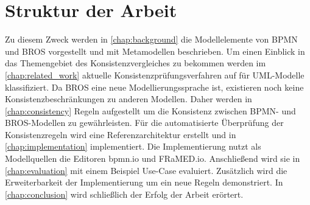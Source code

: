 \section{Struktur der Arbeit}

Zu diesem Zweck werden in \cref{chap:background} die Modellelemente von BPMN und BROS vorgestellt und mit Metamodellen beschrieben.
Um einen Einblick in das Themengebiet des Konsistenzvergleiches zu bekommen werden im \cref{chap:related_work} aktuelle Konsistenzprüfungsverfahren auf für UML-Modelle klassifiziert.
Da BROS eine neue Modellierungssprache ist, existieren noch keine Konsistenzbeschränkungen zu anderen Modellen.
Daher werden in \cref{chap:consistency} Regeln aufgestellt um die Konsistenz zwischen BPMN- und BROS-Modellen zu gewährleisten.
Für die automatisierte Überprüfung der Konsistenzregeln wird eine Referenzarchitektur erstellt und in \cref{chap:implementation} implementiert.
Die Implementierung nutzt als Modellquellen die Editoren bpmn.io und FRaMED.io.
Anschließend wird sie in \cref{chap:evaluation} mit einem Beispiel Use-Case evaluiert.
Zusätzlich wird die Erweiterbarkeit der Implementierung um ein neue Regeln demonstriert.
In \cref{chap:conclusion} wird schließlich der Erfolg der Arbeit erörtert.
